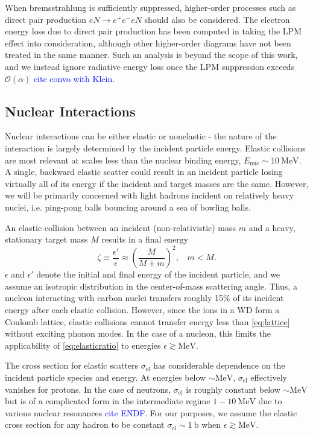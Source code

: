 \documentclass[twocolumn,showpacs,preprintnumbers,amsmath,amssymb,prd]{revtex4}
\newcommand{\OO}{\mathcal{O}}
\def\r{\right)}
\def\l{\left(}
\begin{document}
\begin{appendices}
When bremsstrahlung is sufficiently suppressed, higher-order processes such as direct pair production $e N \rightarrow e^+ e^- e N$ should also be considered.
The electron energy loss due to direct pair production has been computed in \cite{Gerhardt:2010bj} taking the LPM effect into consideration, although other higher-order diagrams have not been treated in the same manner.
Such an analysis is beyond the scope of this work, and we instead ignore radiative energy loss once the LPM suppression exceeds $\OO(\alpha)$ \textcolor{blue}{cite convo with Klein.}

\subsection*{Nuclear Interactions}
Nuclear interactions can be either elastic or nonelastic - the nature of the interaction is largely determined by the incident particle energy.
Elastic collisions are most relevant at scales less than the nuclear binding energy, $E_\text{nuc} \sim 10 ~\text{MeV}$.
A single, backward elastic scatter could result in an incident particle losing virtually all of its energy if the incident and target masses are the same.
However, we will be primarily concerned with light hadrons incident on relatively heavy nuclei, i.e.
ping-pong balls bouncing around a sea of bowling balls.

An elastic collision between an incident (non-relativistic) mass $m$ and a heavy, stationary target mass $M$ results in a final energy
\begin{equation}
\label{eq:elasticratio}
\zeta \equiv \frac{\epsilon'}{\epsilon} \approx \l \frac{M}{M+m} \r^2, ~~~~ m < M.
\end{equation}
$\epsilon$ and $\epsilon'$ denote the initial and final energy of the incident particle, and we assume an isotropic distribution in the center-of-mass scattering angle.
Thus, a nucleon interacting with carbon nuclei transfers roughly 15\% of its incident energy after each elastic collision.
However, since the ions in a WD form a Coulomb lattice, elastic collisions cannot transfer energy less than \eqref{eq:lattice} without exciting phonon modes.
In the case of a nucleon, this limits the applicability of \eqref{eq:elasticratio} to energies $\epsilon \gtrsim \text{MeV}$.

The cross section for elastic scatters $\sigma_\text{el}$ has considerable dependence on the incident particle species and energy.
At energies below $\sim \text{MeV}$, $\sigma_\text{el}$ effectively vanishes for protons.
In the case of neutrons, $\sigma_\text{el}$ is roughly constant below $\sim \text{MeV}$ but is of a complicated form in the intermediate regime $1 - 10 ~\text{MeV}$ due to various nuclear resonances \textcolor{blue}{cite ENDF}.
For our purposes, we assume the elastic cross section for any hadron to be constant $\sigma_\text{el} \sim 1 ~\text{b}$ when $\epsilon \gtrsim \text{MeV}$.


\end{appendices}
\end{document}
